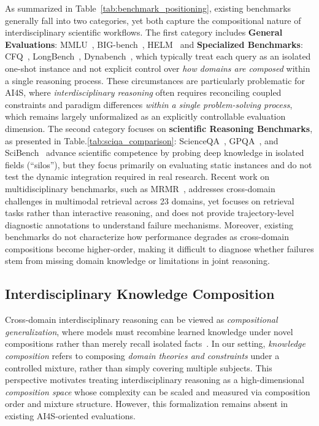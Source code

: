 As summarized in Table~\ref{tab:benchmark_positioning}, existing benchmarks generally fall into two categories, yet both capture the compositional nature of interdisciplinary scientific workflows.
The first category includes \textbf{General Evaluations}: MMLU~\citep{hendrycks2021mmlu}, BIG-bench~\citep{srivastava2022beyond}, HELM~\citep{liang2022helm} and \textbf{Specialized Benchmarks}: CFQ~\citep{keysers2020measuring}, LongBench~\citep{bai-etal-2024-longbench}, Dynabench~\citep{kiela-etal-2021-dynabench}, which typically treat each query as an isolated one-shot instance and not explicit control over \emph{how domains are composed} within a single reasoning process.
These circumstances are particularly problematic for AI4S, where \emph{interdisciplinary reasoning} often requires reconciling coupled constraints and paradigm differences \emph{within a single problem-solving process}, which remains largely unformalized as an explicitly controllable evaluation dimension.
The second category focuses on \textbf{scientific Reasoning Benchmarks}, as presented in Table.\ref{tab:sciqa_comparison}: ScienceQA~\citep{lu2022learn}, GPQA~\citep{rein2024gpqa}, and SciBench~\citep{wang2024scibench} advance scientific competence by probing deep knowledge in isolated fields (``silos''), but they focus primarily on evaluating static instances and do not test the dynamic integration required in real research.
Recent work on multidisciplinary benchmarks, such as MRMR~\citep{zhang2025mrmr}, addresses cross-domain challenges in multimodal retrieval across 23 domains, yet focuses on retrieval tasks rather than interactive reasoning, and does not provide trajectory-level diagnostic annotations to understand failure mechanisms.
Moreover, existing benchmarks do not characterize how performance degrades as cross-domain compositions become higher-order, making it difficult to diagnose whether failures stem from missing domain knowledge or limitations in joint reasoning.


\subsection{Interdisciplinary Knowledge Composition}
\label{sec:related_composition}

Cross-domain interdisciplinary reasoning can be viewed as \emph{compositional generalization}, where models must recombine learned knowledge under novel compositions rather than merely recall isolated facts~\citep{lake2018generalization,keysers2020measuring}.
In our setting, \emph{knowledge composition} refers to composing \emph{domain theories and constraints} under a controlled mixture, rather than simply covering multiple subjects.
This perspective motivates treating interdisciplinary reasoning as a high-dimensional \emph{composition space} whose complexity can be scaled and measured via composition order and mixture structure.
However, this formalization remains absent in existing AI4S-oriented evaluations.
  
